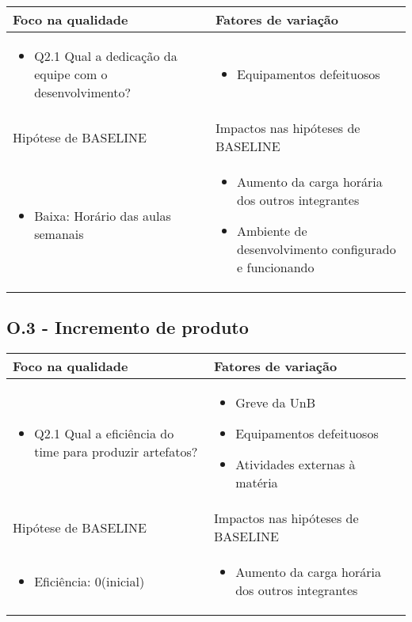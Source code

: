 	\begin{tabular}{ |p{4cm}|p{6cm}|  }
	 \hline
	 Foco na qualidade 		& 		Fatores de variação \\
	 \hline
	 \begin{itemize} \item Q2.1 Qual a dedicação da equipe com o desenvolvimento? \end{itemize} & \begin{itemize} \item Equipamentos defeituosos \end{itemize}\\
	 \hline
	 Hipótese de BASELINE 		& 		Impactos nas hipóteses de BASELINE \\
	 \hline
	 \begin{itemize} \item Baixa: Horário das aulas semanais  \end{itemize} 		& 		\begin{itemize} \item Aumento da carga horária dos outros integrantes 
	 \item Ambiente de desenvolvimento configurado e funcionando \end{itemize} \\
	 \hline
	\end{tabular}

\subsection{O.3 - Incremento de produto}

	\begin{tabular}{ |p{6cm}|p{6cm}|  }
	 \hline
	 Foco na qualidade 		& 		Fatores de variação \\
	 \hline
	 \begin{itemize} \item Q2.1 Qual a eficiência do time para produzir artefatos? \end{itemize} & \begin{itemize} \item Greve da UnB \item Equipamentos defeituosos \item Atividades externas à matéria \end{itemize}\\
	 \hline
	 Hipótese de BASELINE 		& 		Impactos nas hipóteses de BASELINE \\
	 \hline
	 \begin{itemize} \item Eficiência: 0(inicial) \end{itemize} & \begin{itemize} \item Aumento da carga horária dos outros integrantes \end{itemize}
	 \hline
	\end{tabular}